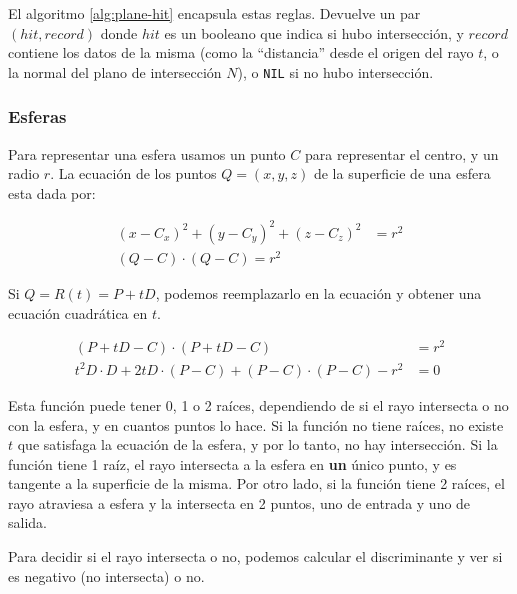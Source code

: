 El algoritmo \ref{alg:plane-hit} encapsula estas reglas. Devuelve un par $(hit,
record)$ donde $hit$ es un booleano que indica si hubo intersección, y $record$
contiene los datos de la misma (como la ``distancia'' desde el origen del rayo
$t$, o la normal del plano de intersección $N$), o \texttt{NIL} si no hubo
intersección.

\subsubsection{Esferas}

Para representar una esfera usamos un punto $C$ para representar el centro, y un
radio $r$. La ecuación de los puntos $Q=(x, y, z)$ de la superficie de una
esfera esta dada por:

\begin{align*}
    (x - C_x)^2 + (y - C_y)^2 + (z - C_z)^2 &= r^2 \\
    (Q - C) \cdot (Q - C) = r^2
\end{align*}

Si $Q = R(t) = P + tD$, podemos reemplazarlo en la ecuación y obtener una
ecuación cuadrática en $t$.

\begin{align*}
    (P + tD - C) \cdot (P + tD - C) &= r^2 \\
    t^2 D \cdot D + 2tD \cdot (P - C) + (P - C) \cdot (P - C) - r^2 &= 0
    \label{eq:cuad-esfera}
\end{align*}

Esta función puede tener 0, 1 o 2 raíces, dependiendo de si el rayo intersecta o
no con la esfera, y en cuantos puntos lo hace. Si la función no tiene raíces, no
existe $t$ que satisfaga la ecuación de la esfera, y por lo tanto, no hay
intersección. Si la función tiene 1 raíz, el rayo intersecta a la esfera en
\textbf{un} único punto, y es tangente a la superficie de la misma. Por otro
lado, si la función tiene 2 raíces, el rayo atraviesa a esfera y la intersecta
en 2 puntos, uno de entrada y uno de salida.

Para decidir si el rayo intersecta o no, podemos calcular el discriminante y ver
si es negativo (no intersecta) o no.

